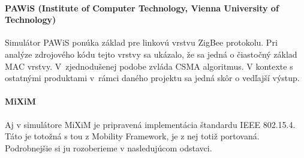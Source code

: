 \paragraph{PAWiS (Institute of Computer Technology, Vienna University of Technology)}
\indent Simulátor PAWiS ponúka základ pre linkovú vrstvu ZigBee protokolu. Pri analýze zdrojového kódu tejto vrstvy sa ukázalo, že sa jedná o čiastočný základ MAC vrstvy. V~zjednodušenej podobe zvláda CSMA algoritmus. V kontexte s ostatnými produktami v~rámci daného projektu sa jedná skôr o vedľajší výstup.
\paragraph{MiXiM}
\indent Aj v simulátore MiXiM je pripravená implementácia štandardu IEEE 802.15.4. Táto je totožná s tou z Mobility Framework, je z nej totiž portovaná. Podrobnejšie si ju rozoberieme v nasledujúcom odstavci.
